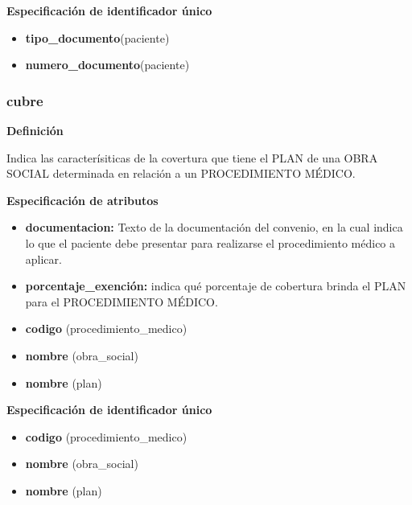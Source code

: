 \documentclass[a4paper,11pt]{article}
\begin{document}
\textbf{Especificación de identificador único}

\begin{itemize}

     \item \textbf{tipo\_documento}(paciente)

     \item \textbf{numero\_documento}(paciente)

\end{itemize}

\subsubsection{\textbf{cubre}}

\textbf{Definición}

Indica las caracterísiticas de la covertura que tiene el PLAN de una 
OBRA SOCIAL determinada en relación a un PROCEDIMIENTO MÉDICO.

\textbf{Especificación de atributos}

\begin{itemize}

     \item \textbf{documentacion:} Texto de la documentación del convenio, en la cual 
     indica lo que el paciente debe presentar para realizarse el procedimiento médico 
     a aplicar.

     \item \textbf{porcentaje\_exención:} indica qué porcentaje de cobertura brinda
     el PLAN para el PROCEDIMIENTO MÉDICO.

     \item \textbf{codigo} (procedimiento\_medico)

     \item \textbf{nombre} (obra\_social)

     \item \textbf{nombre} (plan)
	 
\end{itemize}

\textbf{Especificación de identificador único}

\begin{itemize}

     \item \textbf{codigo} (procedimiento\_medico)

     \item \textbf{nombre} (obra\_social)

     \item \textbf{nombre} (plan)

\end{itemize}
\end{document}
